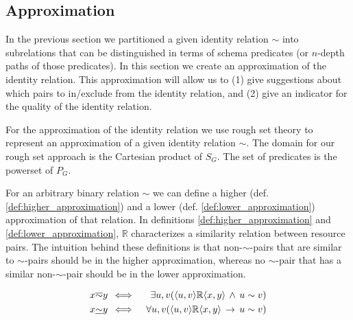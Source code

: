 \subsection{Approximation}
\label{sec:approximation}

In the previous section we partitioned a given identity relation $\sim$
  into subrelations that can be distinguished in terms of schema predicates
  (or $n$-depth paths of those predicates).
In this section we create an approximation of the identity relation.
This approximation will allow us to
  (1) give suggestions about which pairs to in/exclude from
      the identity relation, and
  (2) give an indicator for the quality of the identity relation.

For the approximation of the identity relation we use
  rough set theory \cite{pawlak_1991} to represent an approximation of
  a given identity relation $\sim$.
The domain for our rough set approach is the Cartesian product of $S_G$.
The set of predicates is the powerset of $P_G$.

For an arbitrary binary relation $\sim$ we can define
  a higher (def. \ref{def:higher_approximation}) and
  a lower (def. \ref{def:lower_approximation}) approximation
  of that relation.
In definitions \ref{def:higher_approximation} and
  \ref{def:lower_approximation},
  $\mathbb{R}$ characterizes a similarity relation between resource pairs.
The intuition behind these definitions is that non-$\sim$-pairs
  that are similar to $\sim$-pairs should be in the higher approximation,
  whereas no $\sim$-pair that has a similar non-$\sim$-pair should be
  in the lower approximation.

\small
\begin{definition}
\begin{align}
\label{def:higher_approximation}
x \overline{\sim} y \, & \iff & \,
  \exists u,v (\langle u,v\rangle \mathbb{R} \langle x,y\rangle \,\land\, u \sim v)
\\
\label{def:lower_approximation}
x \underline{\sim} y \, & \iff & \,
  \forall u,v (\langle u,v\rangle \mathbb{R} \langle x,y\rangle \,\rightarrow\, u \sim v)
\end{align}
\end{definition}
\normalsize 

